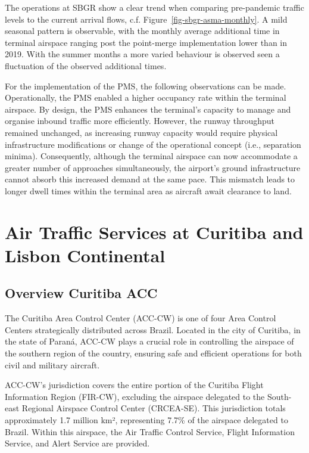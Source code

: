 \documentclass[
  a4paper,
  DIV=11,
  numbers=noendperiod]{scrreport}
\begin{document}
The operations at SBGR show a clear trend when comparing pre-pandemic
traffic levels to the current arrival flows, c.f.
Figure~\ref{fig-sbgr-asma-monthly}. A mild seasonal pattern is
observable, with the monthly average additional time in terminal
airspace ranging post the point-merge implementation lower than in 2019.
With the summer months a more varied behaviour is observed seen a
fluctuation of the observed additional times.

For the implementation of the PMS, the following observations can be
made. Operationally, the PMS enabled a higher occupancy rate within the
terminal airspace. By design, the PMS enhances the terminal's capacity
to manage and organise inbound traffic more efficiently. However, the
runway throughput remained unchanged, as increasing runway capacity
would require physical infrastructure modifications or change of the
operational concept (i.e., separation minima). Consequently, although
the terminal airspace can now accommodate a greater number of approaches
simultaneously, the airport's ground infrastructure cannot absorb this
increased demand at the same pace. This mismatch leads to longer dwell
times within the terminal area as aircraft await clearance to land.

\section{Air Traffic Services at Curitiba and Lisbon
Continental}\label{air-traffic-services-at-curitiba-and-lisbon-continental}

\subsection{Overview Curitiba ACC}\label{overview-curitiba-acc}

The Curitiba Area Control Center (ACC-CW) is one of four Area Control
Centers strategically distributed across Brazil. Located in the city of
Curitiba, in the state of Paraná, ACC-CW plays a crucial role in
controlling the airspace of the southern region of the country, ensuring
safe and efficient operations for both civil and military aircraft.

ACC-CW's jurisdiction covers the entire portion of the Curitiba Flight
Information Region (FIR-CW), excluding the airspace delegated to the
South-east Regional Airspace Control Center (CRCEA-SE). This
jurisdiction totals approximately 1.7 million km², representing 7.7\% of
the airspace delegated to Brazil. Within this airspace, the Air Traffic
Control Service, Flight Information Service, and Alert Service are
provided.
\end{document}

